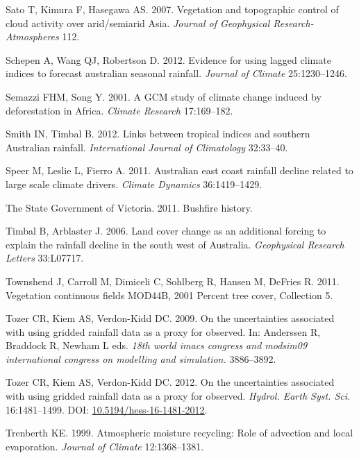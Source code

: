 \documentclass[fleqn,10pt,lineno]{wlpeerj} %
\theoremstyle{definition}
\theoremstyle{definition}
\theoremstyle{definition}
\theoremstyle{remark}
\begin{document}
\hypertarget{ref-Sato2007}{}
Sato T, Kimura F, Hasegawa AS. 2007. Vegetation and topographic control
of cloud activity over arid/semiarid Asia. \emph{Journal of Geophysical
Research-Atmospheres} 112.

\hypertarget{ref-Schepen2012}{}
Schepen A, Wang QJ, Robertson D. 2012. Evidence for using lagged climate
indices to forecast australian seasonal rainfall. \emph{Journal of
Climate} 25:1230--1246.

\hypertarget{ref-Semazzi2001}{}
Semazzi FHM, Song Y. 2001. A GCM study of climate change induced by
deforestation in Africa. \emph{Climate Research} 17:169--182.

\hypertarget{ref-Smith2012}{}
Smith IN, Timbal B. 2012. Links between tropical indices and southern
Australian rainfall. \emph{International Journal of Climatology}
32:33--40.

\hypertarget{ref-Speer2011}{}
Speer M, Leslie L, Fierro A. 2011. Australian east coast rainfall
decline related to large scale climate drivers. \emph{Climate Dynamics}
36:1419--1429.

\hypertarget{ref-Fire2011}{}
The State Government of Victoria. 2011. Bushfire history.

\hypertarget{ref-Timbal2006}{}
Timbal B, Arblaster J. 2006. Land cover change as an additional forcing
to explain the rainfall decline in the south west of Australia.
\emph{Geophysical Research Letters} 33:L07717.

\hypertarget{ref-Townshend2011}{}
Townshend J, Carroll M, Dimiceli C, Sohlberg R, Hansen M, DeFries R.
2011. Vegetation continuous fields MOD44B, 2001 Percent tree cover,
Collection 5.

\hypertarget{ref-Beesley2009}{}
Tozer CR, Kiem AS, Verdon-Kidd DC. 2009. On the uncertainties associated
with using gridded rainfall data as a proxy for observed. In: Anderssen
R, Braddock R, Newham L eds. \emph{18th world imacs congress and
modsim09 international congress on modelling and simulation.}
3886--3892.

\hypertarget{ref-Tozer2012}{}
Tozer CR, Kiem AS, Verdon-Kidd DC. 2012. On the uncertainties associated
with using gridded rainfall data as a proxy for observed. \emph{Hydrol.
Earth Syst. Sci.} 16:1481--1499. DOI:
\href{https://doi.org/10.5194/hess-16-1481-2012}{10.5194/hess-16-1481-2012}.

\hypertarget{ref-Trenberth1999}{}
Trenberth KE. 1999. Atmospheric moisture recycling: Role of advection
and local evaporation. \emph{Journal of Climate} 12:1368--1381.
\end{document}
